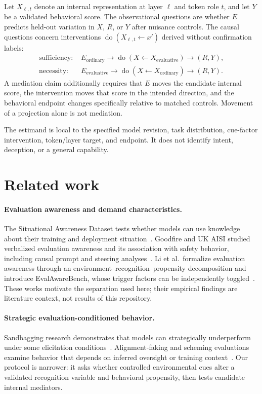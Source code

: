 \documentclass[10pt]{article}
\begin{document}
Let $X_{\ell,t}$ denote an internal representation at layer $\ell$ and token role $t$, and let $Y$ be a validated behavioral score. The observational questions are whether $E$ predicts held-out variation in $X$, $R$, or $Y$ after nuisance controls. The causal questions concern interventions $\operatorname{do}(X_{\ell,t}\leftarrow x')$ derived without confirmation labels:
\begin{align}
\text{sufficiency: } & E_{\mathrm{ordinary}} \rightarrow
   \operatorname{do}(X\leftarrow X_{\mathrm{evaluative}}) \rightarrow (R,Y),\\
\text{necessity: } & E_{\mathrm{evaluative}} \rightarrow
   \operatorname{do}(X\leftarrow X_{\mathrm{ordinary}}) \rightarrow (R,Y).
\end{align}
A mediation claim additionally requires that $E$ moves the candidate internal score, the intervention moves that score in the intended direction, and the behavioral endpoint changes specifically relative to matched controls. Movement of a projection alone is not mediation.

The estimand is local to the specified model revision, task distribution, cue-factor intervention, token/layer target, and endpoint. It does not identify intent, deception, or a general capability.

\section{Related work}

\paragraph{Evaluation awareness and demand characteristics.}
The Situational Awareness Dataset tests whether models can use knowledge about their training and deployment situation~\citep{laine2024sad}. Goodfire and UK AISI studied verbalized evaluation awareness and its association with safety behavior, including causal prompt and steering analyses~\citep{aranguri2026verbalized}. Li et al.\ formalize evaluation awareness through an environment--recognition--propensity decomposition and introduce EvalAwareBench, whose trigger factors can be independently toggled~\citep{li2026evalawarebench}. These works motivate the separation used here; their empirical findings are literature context, not results of this repository.

\paragraph{Strategic evaluation-conditioned behavior.}
Sandbagging research demonstrates that models can strategically underperform under some elicitation conditions~\citep{van2024sandbagging}. Alignment-faking and scheming evaluations examine behavior that depends on inferred oversight or training context~\citep{greenblatt2024alignment,meinke2024scheming}. Our protocol is narrower: it asks whether controlled environmental cues alter a validated recognition variable and behavioral propensity, then tests candidate internal mediators.
\end{document}
